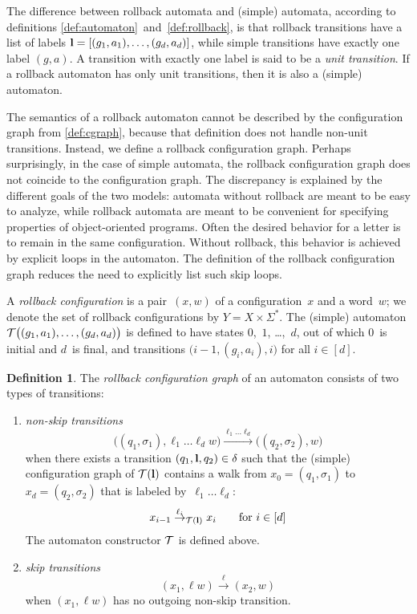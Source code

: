 \documentclass[9pt, preprint]{sigplanconf} %
\theoremstyle{definition}
\newtheorem{definition}{Definition}
\theoremstyle{remark}
\begin{document}
The difference between rollback automata and (simple) automata, according to definitions \ref{def:automaton}~and~\ref{def:rollback}, is that rollback transitions have a list of labels ${\bf l}=[(g_1,a_1),\ldots,(g_d,a_d)]$, while simple transitions have exactly one label $(g,a)$.
A transition with exactly one label is said to be a \emph{unit transition}.
If a rollback automaton has only unit transitions, then it is also a (simple) automaton.

The semantics of a rollback automaton cannot be described by the configuration graph from \autoref{def:cgraph}, because that definition does not handle non-unit transitions.
Instead, we define a rollback configuration graph.
Perhaps surprisingly, in the case of simple automata, the rollback configuration graph does not coincide to the configuration graph.
The discrepancy is explained by the different goals of the two models: automata without rollback are meant to be easy to analyze, while rollback automata are meant to be convenient for specifying properties of object-oriented programs.
Often the desired behavior for a letter is to remain in the same configuration.
Without rollback, this behavior is achieved by explicit loops in the automaton.
The definition of the rollback configuration graph reduces the need to explicitly list such skip loops.

A \emph{rollback configuration} is a pair~$(x,w)$ of a configuration~$x$ and a word~$w$;
we denote the set of rollback configurations by $Y=X\times\Sigma^*$.
The (simple) automaton ${\cal T}\bigl((g_1,a_1),\ldots,(g_d,a_d)\bigr)$ is defined to have states $0$,~$1$, \dots,~$d$, out of which $0$~is initial and $d$~is final, and transitions $\bigl(i-1,(g_i,a_i),i\bigr)$ for all $i\in[d]$.

\begin{definition}
The \emph{rollback configuration graph} of an automaton consists of two types of transitions:
\begin{enumerate}
\item \emph{non-skip transitions}
  \[\bigl((q_1,\sigma_1),\ell_1\ldots\ell_d w\bigr)\xrightarrow{\ell_1\ldots\ell_d}\bigl((q_2,\sigma_2),w\bigr)\]
when there exists a transition $(q_1,{\bf l},q_2)\in\delta$ such that the (simple) configuration graph of ${\cal T}({\bf l})$ contains a walk from $x_0=(q_1,\sigma_1)$ to $x_d=(q_2,\sigma_2)$ that is labeled by~$\ell_1\ldots\ell_d$:
\[ x_{i-1}\stackrel{\ell_i}\to_{{\cal T}({\bf l})} x_i\qquad\text{for $i\in[d]$} \]
The automaton constructor ${\cal T}$ is defined above.
\item \emph{skip transitions}
  \[(x_1,\ell w)\stackrel\ell\to(x_2,w)\]
when $(x_1,\ell w)$ has no outgoing non-skip transition.
\end{enumerate}
\end{definition}
\end{document}
